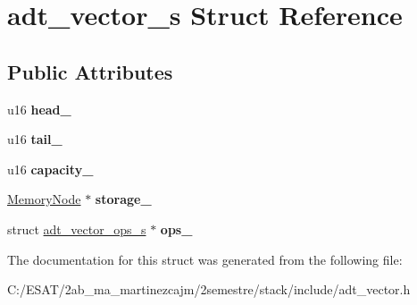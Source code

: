 \hypertarget{structadt__vector__s}{}\section{adt\+\_\+vector\+\_\+s Struct Reference}
\label{structadt__vector__s}
\subsection*{Public Attributes}
\begin{DoxyCompactItemize}
\item 
\mbox{\label{structadt__vector__s_a6f4a7ec5e62d232aa401a141b288aeab}} 
u16 {\bfseries head\+\_\+}
\item 
\mbox{\label{structadt__vector__s_ab2a0f5cd44385df2d8ccd577a1c170a9}} 
u16 {\bfseries tail\+\_\+}
\item 
\mbox{\label{structadt__vector__s_a5e91c337cfe5cba5667b730e09fc3102}} 
u16 {\bfseries capacity\+\_\+}
\item 
\mbox{\label{structadt__vector__s_a70e66b6bf184018e1fca66051b9aa655}} 
\hyperlink{structmemory__node__s}{Memory\+Node} $\ast$ {\bfseries storage\+\_\+}
\item 
\mbox{\label{structadt__vector__s_a85f885e86aaf9d0c923cb9d3d55df64c}} 
struct \hyperlink{structadt__vector__ops__s}{adt\+\_\+vector\+\_\+ops\+\_\+s} $\ast$ {\bfseries ops\+\_\+}
\end{DoxyCompactItemize}


The documentation for this struct was generated from the following file\+:\begin{DoxyCompactItemize}
\item 
C\+:/\+E\+S\+A\+T/2ab\+\_\+ma\+\_\+martinezcajm/2semestre/stack/include/adt\+\_\+vector.\+h\end{DoxyCompactItemize}
